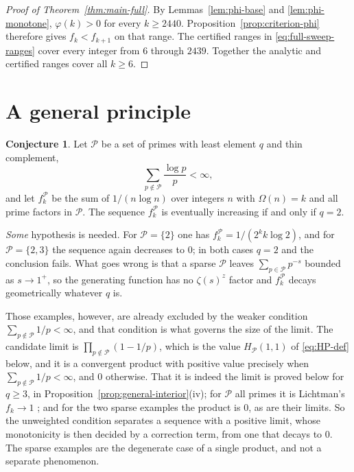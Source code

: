 \documentclass[11pt]{amsart}
\theoremstyle{plain}
\theoremstyle{definition}
\newtheorem{conjecture}[theorem]{Conjecture}
\begin{document}
\begin{proof}[Proof of Theorem~\ref{thm:main-full}]
By Lemmas~\ref{lem:phi-base} and \ref{lem:phi-monotone},
$\varphi(k)>0$ for every $k\geq2440$. Proposition~\ref{prop:criterion-phi}
therefore gives $f_k<f_{k+1}$ on that range. The certified ranges in
\eqref{eq:full-sweep-ranges} cover every integer from $6$ through $2439$.
Together the analytic and certified ranges cover all $k\geq6$.
\end{proof}

\section{A general principle}\label{sec:general-principle}

\begin{conjecture}\label{conj:general}
Let $\mathcal P$ be a set of primes with least element $q$ and thin
complement,
\begin{equation}\label{eq:thin-complement}
  \sum_{p\notin\mathcal P}\frac{\log p}{p}<\infty,
\end{equation}
and let $f_k^{\mathcal P}$ be the sum of $1/(n\log n)$ over integers $n$ with
$\Omega(n)=k$ and all prime factors in $\mathcal P$. The sequence
$f_k^{\mathcal P}$ is eventually increasing if and only if $q=2$.
\end{conjecture}

\emph{Some} hypothesis is needed. For $\mathcal P=\{2\}$ one has
$f_k^{\mathcal P}=1/(2^kk\log2)$, and for $\mathcal P=\{2,3\}$ the sequence
again decreases to $0$; in both cases $q=2$ and the conclusion fails. What
goes wrong is that a sparse $\mathcal P$ leaves $\sum_{p\in\mathcal P}p^{-s}$
bounded as $s\to1^+$, so the generating function has no $\zeta(s)^z$ factor
and $f_k^{\mathcal P}$ decays geometrically whatever $q$ is.

Those examples, however, are already excluded by the weaker condition
$\sum_{p\notin\mathcal P}1/p<\infty$, and that condition is what governs the
size of the limit. The candidate limit is
$\prod_{p\notin\mathcal P}(1-1/p)$, which is the value
$H_{\mathcal P}(1,1)$ of \eqref{eq:HP-def} below, and it is a convergent
product with positive value precisely when
$\sum_{p\notin\mathcal P}1/p<\infty$, and $0$ otherwise. That it is indeed the
limit is proved below for $q\geq3$, in
Proposition~\ref{prop:general-interior}(iv); for $\mathcal P$ all primes it is
Lichtman's $f_k\to1$ \cite{Lichtman19}; and for the two sparse examples the
product is $0$, as are their limits. So the unweighted condition separates a
sequence with a positive limit, whose monotonicity is then decided by a
correction term, from one that decays to $0$. The sparse examples are the
degenerate case of a single product, and not a separate phenomenon.
\end{document}
